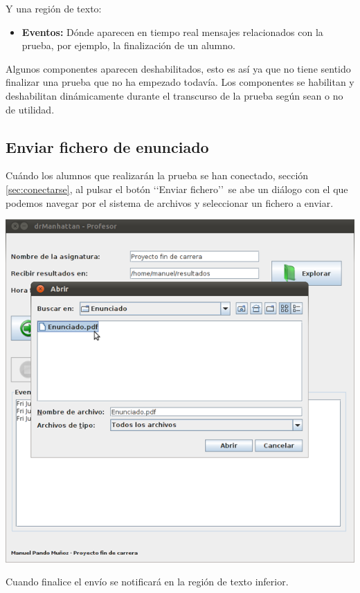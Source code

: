 \documentclass[11pt]{article}
\begin{document}
Y una región de texto:

\begin{itemize}
    \item {\bfseries Eventos:} Dónde aparecen en tiempo real mensajes relacionados con la prueba, por ejemplo, la finalización de un alumno.
\end{itemize}

Algunos componentes aparecen deshabilitados, esto es así ya que no tiene sentido finalizar una prueba que no ha empezado todavía. Los componentes se habilitan y deshabilitan dinámicamente durante el transcurso de la prueba según sean o no de utilidad.


\subsection{Enviar fichero de enunciado}

Cuándo los alumnos que realizarán la prueba se han conectado, sección \ref{sec:conectarse}, al pulsar el botón \lq\lq Enviar fichero\rq\rq \ se abe un diálogo con el que podemos navegar por el sistema de archivos y seleccionar un fichero a enviar.

\begin{center}
    \includegraphics[width=.90\linewidth]{imagenes/enviar}
\end{center}

Cuando finalice el envío se notificará en la región de texto inferior.
\end{document}
